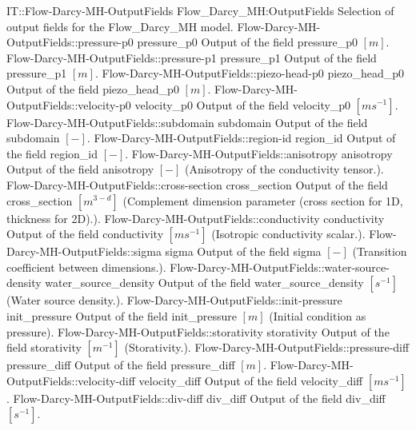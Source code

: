 \begin{SelectionType}
	{IT::Flow-Darcy-MH-OutputFields}
	{Flow{\_}Darcy{\_}MH:OutputFields}
	{{{Selection of output fields for the Flow{\_}Darcy{\_}MH model.}}}
		\SelectionItem
			{Flow-Darcy-MH-OutputFields::pressure-p0}
			{pressure{\_}p0}
			{{{Output of the field pressure{\_}p0 }{$[m]$}{.}}}
		\SelectionItem
			{Flow-Darcy-MH-OutputFields::pressure-p1}
			{pressure{\_}p1}
			{{{Output of the field pressure{\_}p1 }{$[m]$}{.}}}
		\SelectionItem
			{Flow-Darcy-MH-OutputFields::piezo-head-p0}
			{piezo{\_}head{\_}p0}
			{{{Output of the field piezo{\_}head{\_}p0 }{$[m]$}{.}}}
		\SelectionItem
			{Flow-Darcy-MH-OutputFields::velocity-p0}
			{velocity{\_}p0}
			{{{Output of the field velocity{\_}p0 }{$[ms^{-1}]$}{.}}}
		\SelectionItem
			{Flow-Darcy-MH-OutputFields::subdomain}
			{subdomain}
			{{{Output of the field subdomain }{$[-]$}{.}}}
		\SelectionItem
			{Flow-Darcy-MH-OutputFields::region-id}
			{region{\_}id}
			{{{Output of the field region{\_}id }{$[-]$}{.}}}
		\SelectionItem
			{Flow-Darcy-MH-OutputFields::anisotropy}
			{anisotropy}
			{{{Output of the field anisotropy }{$[-]$}{ (Anisotropy of the conductivity tensor.).}}}
		\SelectionItem
			{Flow-Darcy-MH-OutputFields::cross-section}
			{cross{\_}section}
			{{{Output of the field cross{\_}section }{$[m^{3-d}]$}{ (Complement dimension parameter (cross section for 1D, thickness for 2D).).}}}
		\SelectionItem
			{Flow-Darcy-MH-OutputFields::conductivity}
			{conductivity}
			{{{Output of the field conductivity }{$[ms^{-1}]$}{ (Isotropic conductivity scalar.).}}}
		\SelectionItem
			{Flow-Darcy-MH-OutputFields::sigma}
			{sigma}
			{{{Output of the field sigma }{$[-]$}{ (Transition coefficient between dimensions.).}}}
		\SelectionItem
			{Flow-Darcy-MH-OutputFields::water-source-density}
			{water{\_}source{\_}density}
			{{{Output of the field water{\_}source{\_}density }{$[s^{-1}]$}{ (Water source density.).}}}
		\SelectionItem
			{Flow-Darcy-MH-OutputFields::init-pressure}
			{init{\_}pressure}
			{{{Output of the field init{\_}pressure }{$[m]$}{ (Initial condition as pressure).}}}
		\SelectionItem
			{Flow-Darcy-MH-OutputFields::storativity}
			{storativity}
			{{{Output of the field storativity }{$[m^{-1}]$}{ (Storativity.).}}}
		\SelectionItem
			{Flow-Darcy-MH-OutputFields::pressure-diff}
			{pressure{\_}diff}
			{{{Output of the field pressure{\_}diff }{$[m]$}{.}}}
		\SelectionItem
			{Flow-Darcy-MH-OutputFields::velocity-diff}
			{velocity{\_}diff}
			{{{Output of the field velocity{\_}diff }{$[ms^{-1}]$}{.}}}
		\SelectionItem
			{Flow-Darcy-MH-OutputFields::div-diff}
			{div{\_}diff}
			{{{Output of the field div{\_}diff }{$[s^{-1}]$}{.}}}
\end{SelectionType}
